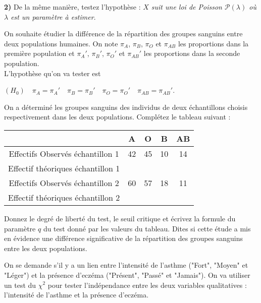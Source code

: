 \documentclass{article}
\numberwithin{equation}{section}
\begin{document}
{\bf 2)} De la même manière, testez l'hypothèse : {\it $X$ suit une loi de Poisson  $\mathcal{P}(\lambda)$ où
$\lambda$ est un paramètre \`a estimer}.\\

\bigskip


On souhaite étudier la différence de la répartition des groupes sanguins entre deux populations humaines.
On note $\pi_{A}$, $\pi_{B}$, $\pi_{O}$ et $\pi_{AB}$ les proportions dans la première population et 
$\pi_{A}'$, $\pi_{B}'$, $\pi_{O}'$ et $\pi_{AB}'$ les proportions dans la seconde population.\\
L'hypothèse qu'on va tester est

$(H_0)\quad \pi_{A}=\pi_{A}' \quad \pi_{B}=\pi_{B}'\quad \pi_{O}=\pi_{O}'\quad \pi_{AB}=\pi_{AB}'$.

On a déterminé les groupes sanguins des individus de deux échantillons choisis respectivement dans les deux 
populations. Complétez  le tableau suivant :\\
\begin{center}
\begin{tabular}{|c|c|c|c|c|}
\hline
     & A & O & B & AB \\
\hline
Effectifs Observés échantillon 1 & 42 & 45 & 10 & 14 \\  
\hline
Effectif théoriques échantillon 1 &     &       &      &     \\
\hline
Effectifs Observés échantillon 2 &  60 & 57 & 18 & 11 \\ 
\hline
Effectif théoriques échantillon 2 &      &      &       &      \\
\hline
\end{tabular}
\end{center}
\smallskip
Donnez le degré de liberté du test, le seuil critique et écrivez la formule du paramètre $q$ du test 
donné par les valeurs du tableau. 
Dites si cette étude a mis en évidence une différence significative de la répartition des groupes 
sanguins entre les deux populations.\\


\bigskip



 

On se demande s'il y a un lien entre l'intensité de l'asthme ("Fort", "Moyen" et "Léger") et la présence d'eczéma
("Présent", "Passé" et "Jamais"). On va utiliser un test du $\chi^2$ pour tester l'indépendance entre les deux 
variables qualitatives : l'intensité de l'asthme et la présence d'eczéma.
\end{document}
